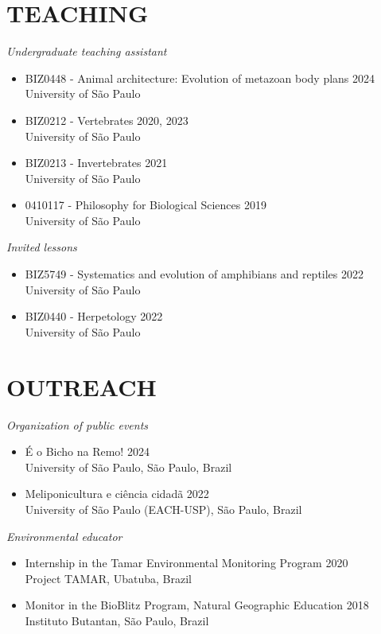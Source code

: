 \documentclass[margin, 10pt]{res} %
\begin{document}
\begin{resume}

\section{TEACHING}
{\sl Undergraduate teaching assistant}
\begin{itemize}
\item BIZ0448 - Animal architecture: Evolution of metazoan body plans \hfill 2024 \\
University of São Paulo
\item BIZ0212 - Vertebrates \hfill 2020, 2023 \\
University of São Paulo
\item BIZ0213 - Invertebrates \hfill 2021 \\
University of São Paulo
\item 0410117 - Philosophy for Biological Sciences \hfill 2019 \\
University of São Paulo
\end{itemize}

{\sl Invited lessons}
\begin{itemize}
\item BIZ5749 - Systematics and evolution of amphibians and reptiles \hfill 2022 \\
University of São Paulo
\item BIZ0440 - Herpetology \hfill 2022 \\
University of São Paulo
\end{itemize}


\section{OUTREACH}
{\sl Organization of public events}
\begin{itemize}
\item É o Bicho  na Remo! \hfill 2024 \\
University of São Paulo, São Paulo, Brazil
\item Meliponicultura e ciência cidadã \hfill 2022 \\
University of São Paulo (EACH-USP), São Paulo, Brazil
\end{itemize}

{\sl Environmental educator}
\begin{itemize}
\item Internship in the Tamar Environmental Monitoring Program \hfill 2020 \\
Project TAMAR, Ubatuba, Brazil
\item Monitor in the BioBlitz Program, Natural Geographic Education \hfill 2018 \\
Instituto Butantan, São Paulo, Brazil
\end{itemize}


\end{resume}
\end{document}
